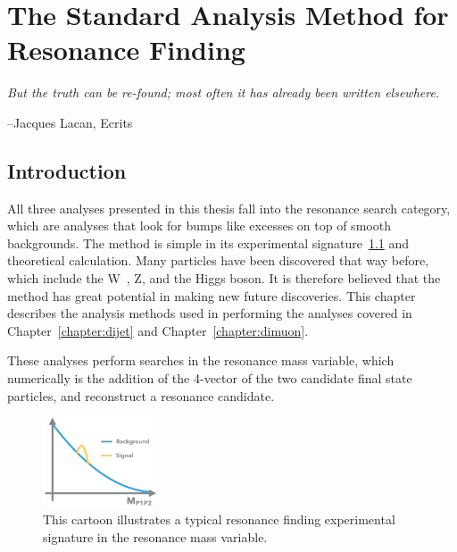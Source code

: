 \chapter{The Standard Analysis Method for Resonance Finding}
\label{chapter:analysismethod}

\epigraph{\textit{But the truth can be re-found; most often it has already been written elsewhere.}}{--Jacques Lacan, Ecrits}



\section{Introduction}
All three analyses presented in this thesis fall into the resonance search category, which are analyses that look for bumps like excesses on top of smooth backgrounds. The method is simple in its experimental signature~\ref{fig:bump} and theoretical calculation. Many particles have been discovered that way before, which include the W~\cite{Arnison:142059}, Z, and the Higgs boson. It is therefore believed that the method has great potential in making new future discoveries. This chapter describes
the analysis methods used in performing the analyses covered in Chapter~\ref{chapter:dijet} and Chapter~\ref{chapter:dimuon}. 

These analyses perform searches in the resonance mass variable, which numerically is the addition of the 4-vector of the two candidate final state particles, and reconstruct a resonance candidate. 

\begin{figure}[!htb]
    \begin{center}
        \includegraphics[width=0.3\textwidth]{figures/chapter_analysismethod/resonance}
        \caption{
            This cartoon illustrates a typical resonance finding experimental signature in the resonance mass variable. 
        }
        \label{fig:bump}
    \end{center}
\end{figure}
\FloatBarrier

